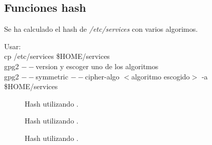 \documentclass[11pt]{article}
\begin{document}
    \subsection{Funciones hash}
      \par
      Se ha calculado el hash de \textit{/etc/services} con varios algorimos.

      \par
      Usar:\\
      cp /etc/services \$HOME/services\\
      gpg2 $--$version \hspace{10mm}y escoger uno de los algoritmos\\
      gpg2 $--$symmetric $--$cipher-algo $<$algoritmo escogido$>$ -a \$HOME/services

      \begin{figure}[!h]
        \centering
        \caption{Hash utilizando .}
      \end{figure}

      \begin{figure}[!h]
        \centering
        \caption{Hash utilizando .}
      \end{figure}

      \begin{figure}[!h]
        \centering
        \caption{Hash utilizando .}
      \end{figure}
\end{document}
